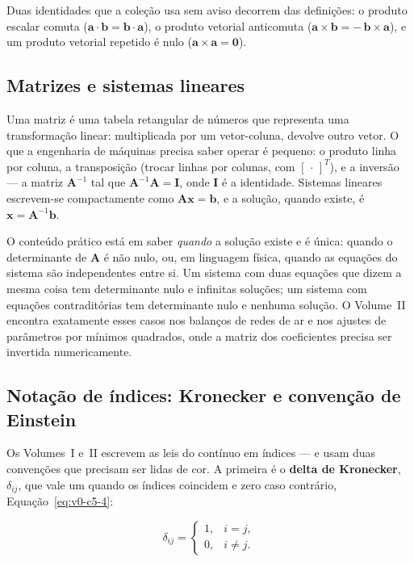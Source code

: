 \documentclass[12pt,a4paper]{article}
\numberwithin{equation}{section}
\numberwithin{table}{section}
\numberwithin{figure}{section}
\begin{document}
Duas identidades que a coleção usa sem aviso decorrem das
definições: o produto escalar comuta ($\bm{a}\cdot\bm{b} =
\bm{b}\cdot\bm{a}$), o produto vetorial anticomuta
($\bm{a}\times\bm{b} = -\,\bm{b}\times\bm{a}$), e um produto vetorial
repetido é nulo ($\bm{a}\times\bm{a} = \bm{0}$).

\subsection{Matrizes e sistemas lineares}

Uma matriz é uma tabela retangular de números que representa uma
transformação linear: multiplicada por um vetor-coluna, devolve outro
vetor. O que a engenharia de máquinas precisa saber operar é pequeno: o
produto linha por coluna, a transposição (trocar linhas por colunas, com
$[\,\cdot\,]^{T}$), e a inversão --- a matriz $\bm{A}^{-1}$ tal que
$\bm{A}^{-1}\bm{A} = \bm{I}$, onde $\bm{I}$ é a identidade. Sistemas
lineares escrevem-se compactamente como $\bm{A}\bm{x} = \bm{b}$, e a
solução, quando existe, é $\bm{x} = \bm{A}^{-1}\bm{b}$.

O conteúdo prático está em saber \emph{quando} a solução existe e é única:
quando o determinante de $\bm{A}$ é não nulo, ou, em linguagem física,
quando as equações do sistema são independentes entre si. Um sistema com
duas equações que dizem a mesma coisa tem determinante nulo e infinitas
soluções; um sistema com equações contraditórias tem determinante nulo e
nenhuma solução. O Volume~II encontra exatamente esses casos nos balanços
de redes de ar e nos ajustes de parâmetros por mínimos quadrados, onde a
matriz dos coeficientes precisa ser invertida numericamente.

\subsection{Notação de índices: Kronecker e convenção de Einstein}

Os Volumes~I e~II escrevem as leis do contínuo em índices --- e usam duas
convenções que precisam ser lidas de cor. A primeira é o \textbf{delta de
Kronecker}, $\delta_{ij}$, que vale um quando os índices coincidem e zero
caso contrário, Equação~\eqref{eq:v0-c5-4}:

\begin{equation}\label{eq:v0-c5-4}
\delta_{ij} =
\begin{cases}
1, & i = j,\\
0, & i \neq j.
\end{cases}
\end{equation}
\end{document}

